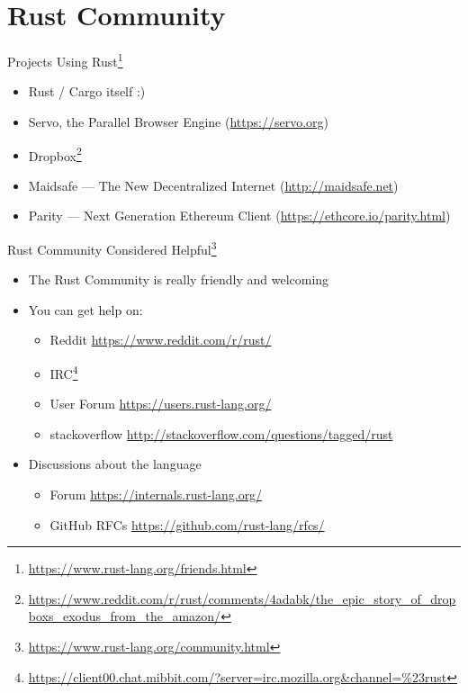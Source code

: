 \section{Rust Community}

\begin{frame}{Projects Using Rust\footnote{\url{https://www.rust-lang.org/friends.html}}}
\begin{itemize}
\item Rust / Cargo itself :)
\item Servo, the Parallel Browser Engine (\url{https://servo.org})
\item Dropbox\footnote{\url{https://www.reddit.com/r/rust/comments/4adabk/the_epic_story_of_dropboxs_exodus_from_the_amazon/}}
\item Maidsafe --- The New Decentralized Internet (\url{http://maidsafe.net})
\item Parity --- Next Generation Ethereum Client (\url{https://ethcore.io/parity.html})
\end{itemize}
\end{frame}

\begin{frame}{Rust Community Considered Helpful\footnote{\url{https://www.rust-lang.org/community.html}}}
\begin{itemize}
\item The Rust Community is really friendly and welcoming
\item You can get help on:
    \begin{itemize}
        \item Reddit {\url{https://www.reddit.com/r/rust/}}
        \item IRC\footnote{\url{https://client00.chat.mibbit.com/?server=irc.mozilla.org&channel=\%23rust}}
        \item User Forum \url{https://users.rust-lang.org/}
        \item stackoverflow \url{http://stackoverflow.com/questions/tagged/rust}
    \end{itemize}
\item Discussions about the language
    \begin{itemize}
        \item Forum \url{https://internals.rust-lang.org/}
        \item GitHub RFCs \url{https://github.com/rust-lang/rfcs/}
    \end{itemize}
\end{itemize}
\end{frame}

